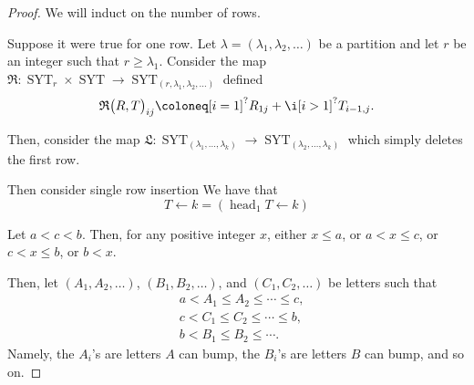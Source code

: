\documentclass{article}
\DeclareMathOperator{\SYT}{SYT}
\begin{document}
\begin{proof}
    We will induct on the number of rows.

    Suppose it were true for one row.
    Let $\lambda = (\lambda_1,\lambda_2,\ldots)$ be a partition and let $r$ be an integer such that $r \geq \lambda_1$. 
    Consider the map $\mathfrak{R}: \SYT_{r} \times \SYT \to \SYT_{(r,\lambda_1,\lambda_2,\ldots)}$ defined
    \[
        \mathfrak{R}\big(R,T\big)_{ij}
        \coloneq
        [i=1]^? R_{1j} + \i [i>1]^? T_{i-1,j}.
    \]


    Then, consider the map $\mathfrak{L}: \SYT_{(\lambda_1,\ldots,\lambda_k)} \to \SYT_{(\lambda_2,\ldots,\lambda_k)}$ which simply deletes the first row.

    Then consider single row insertion
    We have that
    \[
        T \leftarrow k
        =
        (\operatorname{head}_1 T \leftarrow k)
    \]

    Let $a < c < b$.
    Then, for any positive integer $x$, either $x \leq a$, or $a < x \leq c$, or $c < x \leq b$, or $b < x$.

    Then, let $(A_1,A_2,\ldots)$, $(B_1,B_2,\ldots)$, and $(C_1,C_2,\ldots)$ be letters such that
    \begin{align*}
        & a < A_1 \leq A_2 \leq \cdots \leq c, \\ 
        & c < C_1 \leq C_2 \leq \cdots \leq b, \\
        & b < B_1 \leq B_2 \leq \cdots.
    \end{align*}
    Namely, the $A_i$'s are letters $A$ can bump, the $B_i$'s are letters $B$ can bump, and so on.


\end{proof}
\end{document}
